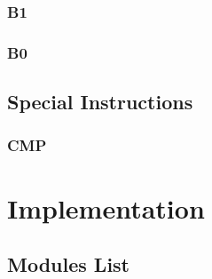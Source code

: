 \documentclass[11pt]{report}
\begin{document}
    \subsection{B1}
    \subsection{B0}

    \section{Special Instructions}
    \subsection{CMP}



    \chapter{Implementation}
    \section{Modules List}
\end{document}
